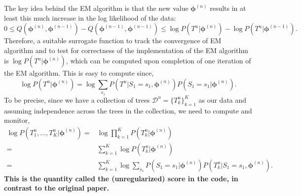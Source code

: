 \documentclass{article}
\begin{document}
The key idea behind the EM algorithm is that the new value $\bm{\phi}^{(n)}$ results in at least this much increase in the log likelihood of the data:
\begin{equation*}
    0 \leq Q(\bm{\phi}^{(n)}, \bm{\phi}^{(n-1)}) - Q(\bm{\phi}^{(n-1)}, \bm{\phi}^{(n-1)}) \leq \log P(T^u | \bm{\phi}^{(n)}) - \log P(T^u | \bm{\phi}^{(n-1)}).
\end{equation*}
Therefore, a suitable surrogate function to track the convergence of EM algorithm and to test for correctness of the implementation of the EM algorithm is $\log P(T^u | \bm{\phi}^{(n)})$, which can be computed upon completion of one iteration of the EM algorithm. This is easy to compute since,
\begin{equation*}
    \log P(T^u | \bm{\phi}^{(n)}) = \log \sum\limits_{s_1} P(T^u | S_1 = s_1, \bm{\phi}^{(n)}) P(S_1 = s_1 | \bm{\phi}^{(n)}).
\end{equation*}
To be precise, since we have a collection of trees $\mathcal{D}^u = \{T^u_k\}_{k=1}^{K}$ as our data and assuming independence across the trees in the collection, we need to compute and monitor,
\begin{align*}
    \log P(T^u_1, ..., T^u_K | \bm{\phi}^{(n)}) =& \log \prod\limits_{k=1}^{K} P(T^u_k | \bm{\phi}^{(n)}) \\
    =& \sum\limits_{k=1}^{K} \log P(T^u_k | \bm{\phi}^{(n)}) \\
    =& \sum\limits_{k=1}^{K} \log \sum\limits_{s_1} P(S_1 = s_1 | \bm{\phi}^{(n)}) P(T^u_k | S_1 = s_1, \bm{\phi}^{(n)}).
\end{align*}
\textbf{This is the quantity called the (unregularized) score in the code, in contrast to the original paper.}
\end{document}
